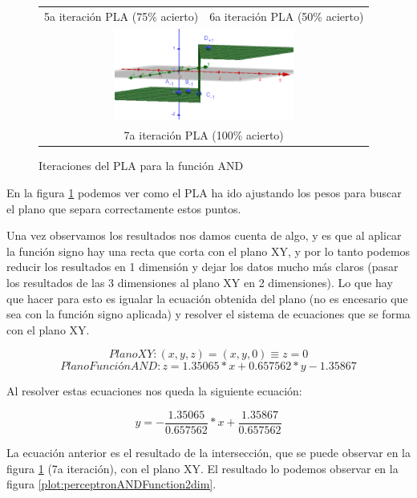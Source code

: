 \begin{figure}[H]
\begin{tabular}{cc}
    5a iteración PLA (75\% acierto) & 6a iteración PLA (50\% acierto) \\[5pt]
    \multicolumn{2}{c}{\includegraphics[width=59mm]{Figures/PerceptronPLA7thiteration}}\\
    \multicolumn{2}{c}{7a iteración PLA (100\% acierto)}
    \end{tabular}
\caption{Iteraciones del PLA para la función AND}
\label{fig:andFunctionPLAIterations}
\end{figure}

\newpage

En la figura \ref{fig:andFunctionPLAIterations} podemos ver como el PLA ha ido ajustando los pesos para buscar el plano que separa correctamente estos puntos.

Una vez observamos los resultados nos damos cuenta de algo, y es que al aplicar la función signo hay una recta que corta con el plano XY, y por lo tanto podemos reducir los resultados en 1 dimensión y dejar los datos mucho más claros (pasar los resultados de las 3 dimensiones al plano XY en 2 dimensiones). Lo que hay que hacer para esto es igualar la ecuación obtenida del plano (no es encesario que sea con la función signo aplicada) y resolver el sistema de ecuaciones que se forma con el plano XY.

\[PlanoXY: (x,y,z)=(x,y,0)\equiv z=0\]
\[PlanoFunciónAND:z=1.35065*x+0.657562*y-1.35867\]

Al resolver estas ecuaciones nos queda la siguiente ecuación:

\[y=-\dfrac{1.35065}{0.657562}*x+\dfrac{1.35867}{0.657562}\]

La ecuación anterior es el resultado de la intersección, que se puede observar en la figura \ref{fig:andFunctionPLAIterations} (7a iteración), con el plano XY. El resultado lo podemos observar en la figura \ref{plot:perceptronANDFunction2dim}.


